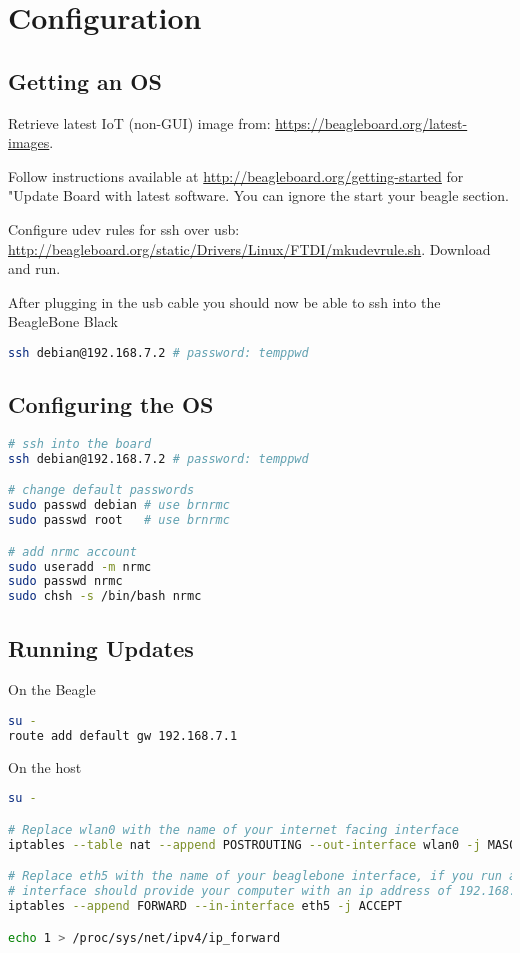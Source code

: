 \documentclass[]{book}
\begin{document}
\section{Configuration}
\subsection{Getting an OS}
Retrieve latest IoT (non-GUI) image from: \url{https://beagleboard.org/latest-images}.

Follow instructions available at \url{http://beagleboard.org/getting-started} for "Update Board with latest software. You can ignore the start your beagle section.

Configure udev rules for ssh over usb: \url{http://beagleboard.org/static/Drivers/Linux/FTDI/mkudevrule.sh}. Download and run.

After plugging in the usb cable you should now be able to ssh into the BeagleBone Black

\begin{lstlisting}[language=bash]
ssh debian@192.168.7.2 # password: temppwd
\end{lstlisting}

\pagebreak
\subsection{Configuring the OS}
\begin{lstlisting}[language=bash]
# ssh into the board
ssh debian@192.168.7.2 # password: temppwd

# change default passwords
sudo passwd debian # use brnrmc
sudo passwd root   # use brnrmc

# add nrmc account
sudo useradd -m nrmc
sudo passwd nrmc
sudo chsh -s /bin/bash nrmc
\end{lstlisting}

\subsection{Running Updates}
On the Beagle
\begin{lstlisting}[language=bash]
su -
route add default gw 192.168.7.1
\end{lstlisting}
On the host
\begin{lstlisting}[language=bash]
su -

# Replace wlan0 with the name of your internet facing interface
iptables --table nat --append POSTROUTING --out-interface wlan0 -j MASQUERADE

# Replace eth5 with the name of your beaglebone interface, if you run an ifconfig that
# interface should provide your computer with an ip address of 192.168.7.1
iptables --append FORWARD --in-interface eth5 -j ACCEPT

echo 1 > /proc/sys/net/ipv4/ip_forward
\end{lstlisting}
\end{document}
